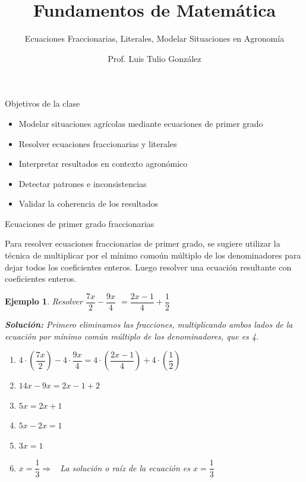 \documentclass[10pt]{beamer}
\title{Fundamentos de Matemática}
\subtitle{Ecuaciones Fraccionarias, Literales, Modelar Situaciones en Agronomía}
\author{Prof. Luis Tulio González}
\institute{Universidad Santo Tomás}
\date{}
\newtheorem{ejemplo}{Ejemplo}
\begin{document}
	
	\frame{\titlepage}
	
	\begin{frame}{Objetivos de la clase}
		\begin{itemize}
			\item Modelar situaciones agrícolas mediante ecuaciones de primer grado
			\item Resolver ecuaciones fraccionarias y literales
			\item Interpretar resultados en contexto agronómico
			\item Detectar patrones e inconsistencias
			\item Validar la coherencia de los resultados
		\end{itemize}
	\end{frame}
	
	
	
	\begin{frame}{Ecuaciones de primer grado fraccionarias}
	
	Para resolver ecuaciones fraccionarias de primer grado, se sugiere utilizar
	la técnica de multiplicar por el mínimo comoún múltiplo de
	los denominadores para dejar todos los coeficientes enteros. Luego resolver
	una ecuación resultante con coeficientes enteros.\pause
	
	\begin{ejemplo}
		Resolver $\dfrac{7x}{2}-\dfrac{9x}{4}$ $=\dfrac{2x-1}{4}+\dfrac{1}{2}$%
		\pause
		
		\textbf{Solución:} Primero eliminamos las fracciones, multiplicando
		ambos lados de la ecuación por mínimo común múltiplo de los
		denominadores, que es 4.
		
		\begin{enumerate}
			\item $4\cdot \left( \dfrac{7x}{2}\right) -4\cdot \dfrac{9x}{4}=4\cdot
			\left( \dfrac{2x-1}{4}\right) +4\cdot \left( \dfrac{1}{2}\right) $
			
			\item $14x-9x=2x-1+2$
			
			\item $5x=2x+1$
			
			\item $5x-2x=1$
			
			\item $3x=1$
			
			\item $x=\dfrac{1}{3}\Longrightarrow $ \ La solución o raíz de la
			ecuación es $x=\dfrac{1}{3}$
		\end{enumerate}
	\end{ejemplo}
	
\end{frame}
\end{document}

